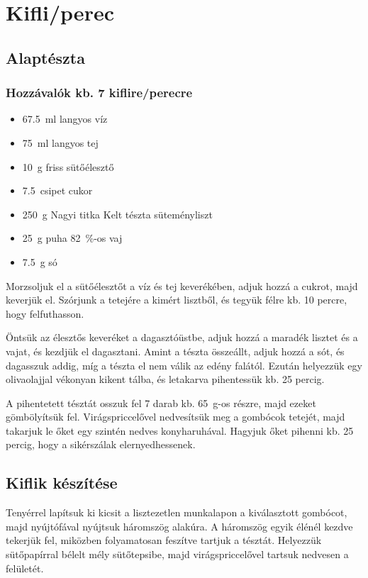 \newpage
\section*{Kifli/perec}

\subsection*{Alaptészta}
\subsubsection*{Hozzávalók kb. 7 kiflire/perecre}
\begin{itemize}
    \item \qty{67.5}{\ml} langyos víz
    \item \qty{75}{\ml} langyos tej
    \item \qty{10}{\g} friss sütőélesztő
    \item \qty{7.5}{csipet} cukor
    \item \qty{250}{\g} Nagyi titka Kelt tészta süteményliszt
    \item \qty{25}{\g} puha \qty{82}{\percent}-os vaj
    \item \qty{7.5}{\g} só
\end{itemize}

Morzsoljuk el a sütőélesztőt a víz és tej keverékében, adjuk hozzá a cukrot, majd keverjük el. Szórjunk a tetejére a kimért lisztből, és tegyük félre kb. \num{10} percre, hogy felfuthasson.

Öntsük az élesztős keveréket a dagasztóüstbe, adjuk hozzá a maradék lisztet és a vajat, és kezdjük el dagasztani. Amint a tészta összeállt, adjuk hozzá a sót, és dagasszuk addig, míg a tészta el nem válik az edény falától. Ezután helyezzük egy olivaolajjal vékonyan kikent tálba, és letakarva pihentessük kb. \num{25} percig.

A pihentetett tésztát osszuk fel \num{7} darab kb. \qty{65}{\g}-os részre, majd ezeket gömbölyítsük fel. Virágspriccelővel nedvesítsük meg a gombócok tetejét, majd takarjuk le őket egy szintén nedves konyharuhával. Hagyjuk őket pihenni kb. \num{25} percig, hogy a sikérszálak elernyedhessenek.~\cite{szabi_kifli}

\subsection*{Kiflik készítése}
Tenyérrel lapítsuk ki kicsit a lisztezetlen munkalapon a kiválasztott gombócot, majd nyújtófával nyújtsuk háromszög alakúra. A háromszög egyik élénél kezdve tekerjük fel, miközben folyamatosan feszítve tartjuk a tésztát. Helyezzük sütőpapírral bélelt mély sütőtepsibe, majd virágspriccelővel tartsuk nedvesen a felületét.

